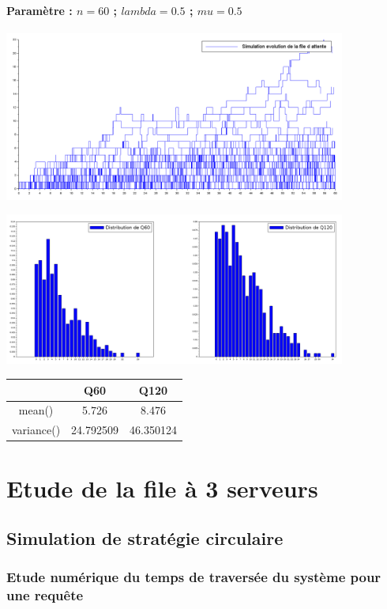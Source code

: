 \documentclass{article}
\begin{document}
\paragraph{Paramètre : $n=60$ ; $lambda=0.5$ ; $mu=0.5$}
\begin{center}
	\includegraphics[width=425px]{img/egal.PNG}
\end{center}
\begin{center}
	\includegraphics[width=425px]{img/egal/dist.png}
\end{center}
\begin{center}
	\begin{tabular}{c||c||c}
		& Q60 & Q120 \\
		\hline \hline
		mean() & 5.726 & 8.476 \\
		\hline \hline
		variance() & 24.792509 & 46.350124 \\
	\end{tabular}
\end{center}


\section{Etude de la file à 3 serveurs}

\subsection{Simulation de stratégie circulaire}
\subsubsection{Etude numérique du temps de traversée du système pour une requête}
\end{document}
